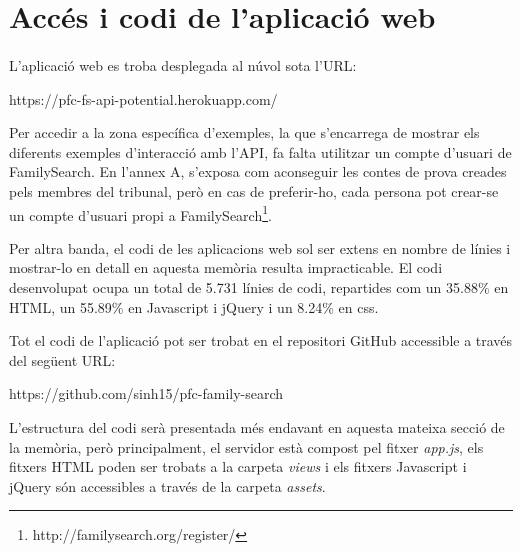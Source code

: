 \section{Accés i codi de l'aplicació web}

    \paragraph{}
    L’aplicació web es troba desplegada al núvol sota l'URL:

    \begin{displayquote}
        https://pfc-fs-api-potential.herokuapp.com/
    \end{displayquote}

    Per accedir a la zona específica d’exemples, la que s’encarrega de mostrar els diferents exemples d’interacció amb l’API, fa falta utilitzar un compte d’usuari de FamilySearch. En l’annex A, s'exposa com aconseguir les contes de prova creades pels membres del tribunal, però en cas de preferir-ho, cada persona pot crear-se un compte d’usuari propi a FamilySearch\footnote{http://familysearch.org/register/}.

    Per altra banda, el codi de les aplicacions web sol ser extens en nombre de línies i mostrar-lo en detall en aquesta memòria resulta impracticable. El codi desenvolupat ocupa un total de 5.731 línies de codi, repartides com un 35.88\% en HTML, un 55.89\% en Javascript i jQuery i un 8.24\% en css.

    Tot el codi de l’aplicació pot ser trobat en el repositori GitHub accessible a través del següent URL:

    \begin{displayquote}
        https://github.com/sinh15/pfc-family-search
    \end{displayquote}

    L’estructura del codi serà presentada més endavant en aquesta mateixa secció de la memòria, però principalment, el servidor està compost pel fitxer \emph{app.js}, els fitxers HTML poden ser trobats a la carpeta \emph{views} i els fitxers Javascript i jQuery són accessibles a través de la carpeta \emph{assets}.
